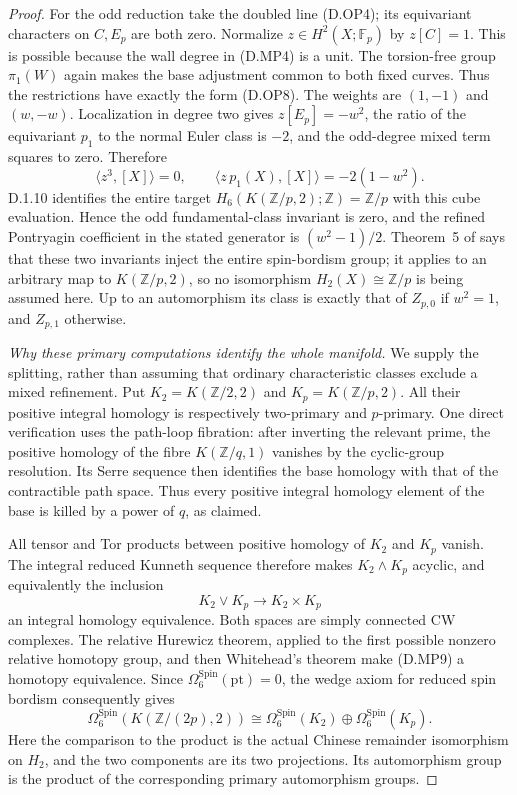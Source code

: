 \begin{proof}
For the odd reduction take the doubled line (D.OP4); its
equivariant characters on $C,E_p$ are both zero. Normalize
$z\in H^2(X;\mathbb F_p)$ by $z[C]=1$. This is possible
because the wall degree in (D.MP4) is a unit. The torsion-free
group $\pi_1(W)$ again makes the base adjustment common to
both fixed curves. Thus the restrictions have exactly the
form (D.OP8). The weights are $(1,-1)$ and $(w,-w)$.
Localization in degree two gives $z[E_p]=-w^2$, the ratio
of the equivariant $p_1$ to the normal Euler class is $-2$,
and the odd-degree mixed term squares to zero. Therefore
\[
 \langle z^3,[X]\rangle=0,\qquad
 \langle z\,p_1(X),[X]\rangle=-2(1-w^2).                 \tag{D.MP8}
\]
D.1.10 identifies the entire target
$H_6(K(\mathbb Z/p,2);\mathbb Z)=\mathbb Z/p$ with this cube
evaluation. Hence the odd fundamental-class invariant is zero,
and the refined Pontryagin coefficient in the stated generator
is $(w^2-1)/2$. Theorem~5 of \cite[p.796]{manZhubr75} says
that these two invariants inject the entire spin-bordism group;
it applies to an arbitrary map to $K(\mathbb Z/p,2)$, so no
isomorphism $H_2(X)\cong\mathbb Z/p$ is being assumed here.
Up to an automorphism its class is exactly that of
$Z_{p,0}$ if $w^2=1$, and $Z_{p,1}$ otherwise.

\emph{Why these primary computations identify the whole manifold.}
We supply the splitting, rather than assuming that ordinary
characteristic classes exclude a mixed refinement. Put
$K_2=K(\mathbb Z/2,2)$ and $K_p=K(\mathbb Z/p,2)$.
All their positive integral homology is respectively two-primary
and $p$-primary. One direct verification uses the path-loop
fibration: after inverting the relevant prime, the positive
homology of the fibre $K(\mathbb Z/q,1)$ vanishes by the
cyclic-group resolution. Its Serre sequence then identifies
the base homology with that of the contractible path space.
Thus every positive integral homology element of the base is
killed by a power of $q$, as claimed.

All tensor and Tor products between positive homology of
$K_2$ and $K_p$ vanish. The integral reduced Kunneth sequence
therefore makes $K_2\wedge K_p$ acyclic, and equivalently
the inclusion
\[
                K_2\vee K_p\longrightarrow K_2\times K_p
                                                        \tag{D.MP9}
\]
an integral homology equivalence. Both spaces are simply
connected CW complexes. The relative Hurewicz theorem,
applied to the first possible nonzero relative homotopy group,
and then Whitehead's theorem make (D.MP9) a homotopy equivalence.
Since $\Omega^{\mathrm{Spin}}_6(\mathrm{pt})=0$, the wedge
axiom for reduced spin bordism consequently gives
\[
 \Omega^{\mathrm{Spin}}_6(K(\mathbb Z/(2p),2))
 \cong\Omega^{\mathrm{Spin}}_6(K_2)
       \oplus\Omega^{\mathrm{Spin}}_6(K_p).               \tag{D.MP10}
\]
Here the comparison to the product is the actual Chinese
remainder isomorphism on $H_2$, and the two components are
its two projections. Its automorphism group is the product
of the corresponding primary automorphism groups.


\end{proof}
